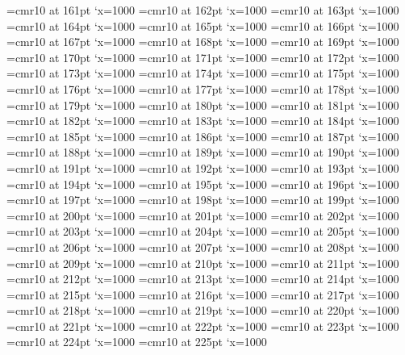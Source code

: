 \font\F=cmr10 at 161pt \efcode\F`x=1000
\font\F=cmr10 at 162pt \efcode\F`x=1000
\font\F=cmr10 at 163pt \efcode\F`x=1000
\font\F=cmr10 at 164pt \efcode\F`x=1000
\font\F=cmr10 at 165pt \efcode\F`x=1000
\font\F=cmr10 at 166pt \efcode\F`x=1000
\font\F=cmr10 at 167pt \efcode\F`x=1000
\font\F=cmr10 at 168pt \efcode\F`x=1000
\font\F=cmr10 at 169pt \efcode\F`x=1000
\font\F=cmr10 at 170pt \efcode\F`x=1000
\font\F=cmr10 at 171pt \efcode\F`x=1000
\font\F=cmr10 at 172pt \efcode\F`x=1000
\font\F=cmr10 at 173pt \efcode\F`x=1000
\font\F=cmr10 at 174pt \efcode\F`x=1000
\font\F=cmr10 at 175pt \efcode\F`x=1000
\font\F=cmr10 at 176pt \efcode\F`x=1000
\font\F=cmr10 at 177pt \efcode\F`x=1000
\font\F=cmr10 at 178pt \efcode\F`x=1000
\font\F=cmr10 at 179pt \efcode\F`x=1000
\font\F=cmr10 at 180pt \efcode\F`x=1000
\font\F=cmr10 at 181pt \efcode\F`x=1000
\font\F=cmr10 at 182pt \efcode\F`x=1000
\font\F=cmr10 at 183pt \efcode\F`x=1000
\font\F=cmr10 at 184pt \efcode\F`x=1000
\font\F=cmr10 at 185pt \efcode\F`x=1000
\font\F=cmr10 at 186pt \efcode\F`x=1000
\font\F=cmr10 at 187pt \efcode\F`x=1000
\font\F=cmr10 at 188pt \efcode\F`x=1000
\font\F=cmr10 at 189pt \efcode\F`x=1000
\font\F=cmr10 at 190pt \efcode\F`x=1000
\font\F=cmr10 at 191pt \efcode\F`x=1000
\font\F=cmr10 at 192pt \efcode\F`x=1000
\font\F=cmr10 at 193pt \efcode\F`x=1000
\font\F=cmr10 at 194pt \efcode\F`x=1000
\font\F=cmr10 at 195pt \efcode\F`x=1000
\font\F=cmr10 at 196pt \efcode\F`x=1000
\font\F=cmr10 at 197pt \efcode\F`x=1000
\font\F=cmr10 at 198pt \efcode\F`x=1000
\font\F=cmr10 at 199pt \efcode\F`x=1000
\font\F=cmr10 at 200pt \efcode\F`x=1000
\font\F=cmr10 at 201pt \efcode\F`x=1000
\font\F=cmr10 at 202pt \efcode\F`x=1000
\font\F=cmr10 at 203pt \efcode\F`x=1000
\font\F=cmr10 at 204pt \efcode\F`x=1000
\font\F=cmr10 at 205pt \efcode\F`x=1000
\font\F=cmr10 at 206pt \efcode\F`x=1000
\font\F=cmr10 at 207pt \efcode\F`x=1000
\font\F=cmr10 at 208pt \efcode\F`x=1000
\font\F=cmr10 at 209pt \efcode\F`x=1000
\font\F=cmr10 at 210pt \efcode\F`x=1000
\font\F=cmr10 at 211pt \efcode\F`x=1000
\font\F=cmr10 at 212pt \efcode\F`x=1000
\font\F=cmr10 at 213pt \efcode\F`x=1000
\font\F=cmr10 at 214pt \efcode\F`x=1000
\font\F=cmr10 at 215pt \efcode\F`x=1000
\font\F=cmr10 at 216pt \efcode\F`x=1000
\font\F=cmr10 at 217pt \efcode\F`x=1000
\font\F=cmr10 at 218pt \efcode\F`x=1000
\font\F=cmr10 at 219pt \efcode\F`x=1000
\font\F=cmr10 at 220pt \efcode\F`x=1000
\font\F=cmr10 at 221pt \efcode\F`x=1000
\font\F=cmr10 at 222pt \efcode\F`x=1000
\font\F=cmr10 at 223pt \efcode\F`x=1000
\font\F=cmr10 at 224pt \efcode\F`x=1000
\font\F=cmr10 at 225pt \efcode\F`x=1000
